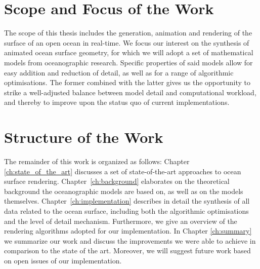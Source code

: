 \section{Scope and Focus of the Work}
\label{sec:scope_and_focus}
The scope of this thesis includes the generation, animation and rendering of the
surface of an open ocean in real-time. We focus our interest on the synthesis of
animated ocean surface geometry, for which we will adopt a set of mathematical
models from oceanographic research. Specific properties of said models allow for
easy addition and reduction of detail, as well as for a range of algorithmic
optimisations. The former combined with the latter gives us the opportunity to
strike a well-adjusted balance between model detail and computational workload,
and thereby to improve upon the status quo of current implementations.


\section{Structure of the Work}
\label{sec:structure}
The remainder of this work is organized as follows: Chapter
\ref{ch:state_of_the_art} discusses a set of state-of-the-art approaches to
ocean surface rendering. Chapter~\ref{ch:background} elaborates on the
theoretical background the oceanographic models are based on, as well as on the
models themselves. Chapter~\ref{ch:implementation} describes in detail the
synthesis of all data related to the ocean surface, including both the algorithmic
optimisations and the level of detail mechanism. Furthermore, we give an overview
of the rendering algorithms adopted for our implementation. In Chapter
\ref{ch:summary} we summarize our work and discuss the improvements we were able
to achieve in comparison to the state of the art. Moreover, we will suggest
future work based on open issues of our implementation.